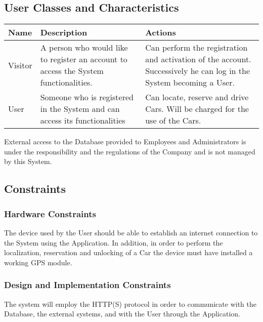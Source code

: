 \subsection{User Classes and Characteristics}
\begin{center}
  \begin{tabular}{|p{}|p{}|p{}|}
    \hline
    \textbf{Name} & \textbf{Description} & \textbf{Actions} \\ \hline
    Visitor & A person who would like to register an account to access the System functionalities. & Can perform the registration and activation of the account. Successively he can log in the System becoming a User.\\\hline
    User & Someone who is registered in the System and can access its functionalities & Can locate, reserve and drive Cars. Will be charged for the use of the Cars. \\ \hline
    \end{tabular}
\end{center}
\vspace{5mm}
External access to the Database provided to Employees and Administrators is under the responsibility and the regulations of the Company and is not managed by this System.


\subsection{Constraints}
\subsubsection{Hardware Constraints}\label{OE}
The device used by the User should be able to establish an internet connection to the System using the Application. In addition, in order to perform the localization, reservation and unlocking of a Car the device must have installed a working GPS module. 

\subsubsection{Design and Implementation Constraints}
The system will employ the HTTP(S) protocol in order to communicate with the Database, the external systems, and with the User through the Application. 

